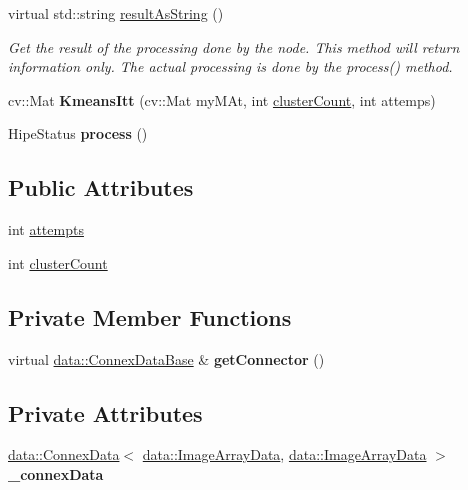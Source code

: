 \begin{DoxyCompactItemize}
\item 
virtual std\+::string \hyperlink{classfilter_1_1algos_1_1_kmeans_aed99c18aeec39add2955b2b9b3361a8a}{result\+As\+String} ()
\begin{DoxyCompactList}\small\item\em Get the result of the processing done by the node. This method will return information only. The actual processing is done by the process() method. \end{DoxyCompactList}\item 
\mbox{\label{classfilter_1_1algos_1_1_kmeans_a2967b1b18ca3d08daa3abc98dd31ff0e}} 
cv\+::\+Mat {\bfseries Kmeans\+Itt} (cv\+::\+Mat my\+M\+At, int \hyperlink{classfilter_1_1algos_1_1_kmeans_a14f679e68a64bab5f4becf3b99b962cb}{cluster\+Count}, int attemps)
\item 
\mbox{\label{classfilter_1_1algos_1_1_kmeans_ade49449a7ca6ee5ebbc038c36a3e6262}} 
Hipe\+Status {\bfseries process} ()
\end{DoxyCompactItemize}
\subsection*{Public Attributes}
\begin{DoxyCompactItemize}
\item 
int \hyperlink{classfilter_1_1algos_1_1_kmeans_acf7a19eeb7e9e2290379094bf1d21dd9}{attempts}
\item 
int \hyperlink{classfilter_1_1algos_1_1_kmeans_a14f679e68a64bab5f4becf3b99b962cb}{cluster\+Count}
\end{DoxyCompactItemize}
\subsection*{Private Member Functions}
\begin{DoxyCompactItemize}
\item 
\mbox{\label{classfilter_1_1algos_1_1_kmeans_acc89011d8ba1c553c9a89e3749a04c6a}} 
virtual \hyperlink{classfilter_1_1data_1_1_connex_data_base}{data\+::\+Connex\+Data\+Base} \& {\bfseries get\+Connector} ()
\end{DoxyCompactItemize}
\subsection*{Private Attributes}
\begin{DoxyCompactItemize}
\item 
\mbox{\label{classfilter_1_1algos_1_1_kmeans_a34a8fed239347bfd3cbeab8b53cd7161}} 
\hyperlink{classfilter_1_1data_1_1_connex_data}{data\+::\+Connex\+Data}$<$ \hyperlink{classfilter_1_1data_1_1_image_array_data}{data\+::\+Image\+Array\+Data}, \hyperlink{classfilter_1_1data_1_1_image_array_data}{data\+::\+Image\+Array\+Data} $>$ {\bfseries \+\_\+connex\+Data}
\end{DoxyCompactItemize}
